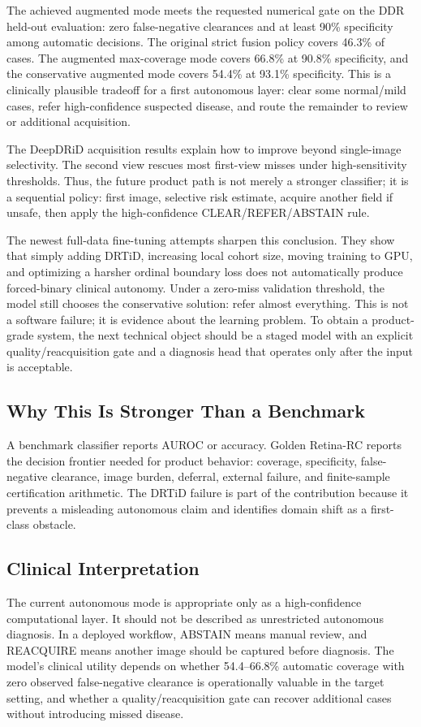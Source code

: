 \documentclass[journal]{IEEEtran}
\begin{document}
The achieved augmented mode meets the requested numerical gate on the DDR held-out evaluation: zero false-negative clearances and at least 90\% specificity among automatic decisions. The original strict fusion policy covers 46.3\% of cases. The augmented max-coverage mode covers 66.8\% at 90.8\% specificity, and the conservative augmented mode covers 54.4\% at 93.1\% specificity. This is a clinically plausible tradeoff for a first autonomous layer: clear some normal/mild cases, refer high-confidence suspected disease, and route the remainder to review or additional acquisition.

The DeepDRiD acquisition results explain how to improve beyond single-image selectivity. The second view rescues most first-view misses under high-sensitivity thresholds. Thus, the future product path is not merely a stronger classifier; it is a sequential policy: first image, selective risk estimate, acquire another field if unsafe, then apply the high-confidence CLEAR/REFER/ABSTAIN rule.

The newest full-data fine-tuning attempts sharpen this conclusion. They show that simply adding DRTiD, increasing local cohort size, moving training to GPU, and optimizing a harsher ordinal boundary loss does not automatically produce forced-binary clinical autonomy. Under a zero-miss validation threshold, the model still chooses the conservative solution: refer almost everything. This is not a software failure; it is evidence about the learning problem. To obtain a product-grade system, the next technical object should be a staged model with an explicit quality/reacquisition gate and a diagnosis head that operates only after the input is acceptable.

\subsection{Why This Is Stronger Than a Benchmark}
A benchmark classifier reports AUROC or accuracy. Golden Retina-RC reports the decision frontier needed for product behavior: coverage, specificity, false-negative clearance, image burden, deferral, external failure, and finite-sample certification arithmetic. The DRTiD failure is part of the contribution because it prevents a misleading autonomous claim and identifies domain shift as a first-class obstacle.

\subsection{Clinical Interpretation}
The current autonomous mode is appropriate only as a high-confidence computational layer. It should not be described as unrestricted autonomous diagnosis. In a deployed workflow, ABSTAIN means manual review, and REACQUIRE means another image should be captured before diagnosis. The model's clinical utility depends on whether 54.4--66.8\% automatic coverage with zero observed false-negative clearance is operationally valuable in the target setting, and whether a quality/reacquisition gate can recover additional cases without introducing missed disease.
\end{document}

